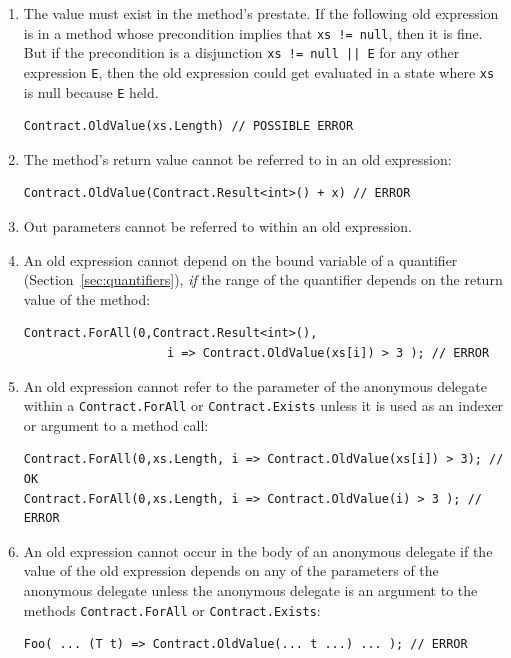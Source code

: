 \documentclass{article}
\newcommand{\code}[1]{\lstinline{#1}}
\begin{document}
\begin{enumerate}
\item The value must exist in the method's prestate. If the following old expression
is in a method whose precondition implies that \code{xs != null}, then it is fine.
But if the precondition is a disjunction \code{xs != null || E} for any other expression
\code{E}, then the old expression could get evaluated in a state where \code{xs} is null
because \code{E} held.
\begin{lstlisting}
Contract.OldValue(xs.Length) // POSSIBLE ERROR
\end{lstlisting}
\item The method's return value cannot be referred to in an old expression:
\begin{lstlisting}
Contract.OldValue(Contract.Result<int>() + x) // ERROR
\end{lstlisting}
\item Out parameters cannot be referred to within an old expression.
\item An old expression cannot depend on the bound variable of a quantifier
(Section~\ref{sec:quantifiers}), \textit{if} the range of the quantifier depends on the return
value of the method:
\begin{lstlisting}
Contract.ForAll(0,Contract.Result<int>(),
                    i => Contract.OldValue(xs[i]) > 3 ); // ERROR
\end{lstlisting}
\item An old expression cannot refer to the parameter of the anonymous delegate within a
\code{Contract.ForAll} or \code{Contract.Exists} unless it is used as an
indexer or argument to a method call:
\begin{lstlisting}
Contract.ForAll(0,xs.Length, i => Contract.OldValue(xs[i]) > 3); // OK
Contract.ForAll(0,xs.Length, i => Contract.OldValue(i) > 3 ); // ERROR
\end{lstlisting}
\item An old expression cannot occur in the body of an anonymous
delegate if the value of the old expression depends on any of the
parameters of the anonymous delegate unless the anonymous delegate is
an argument to the methods \code{Contract.ForAll} or
\code{Contract.Exists}:
\begin{lstlisting}
Foo( ... (T t) => Contract.OldValue(... t ...) ... ); // ERROR
\end{lstlisting}
\end{enumerate}
\end{document}
